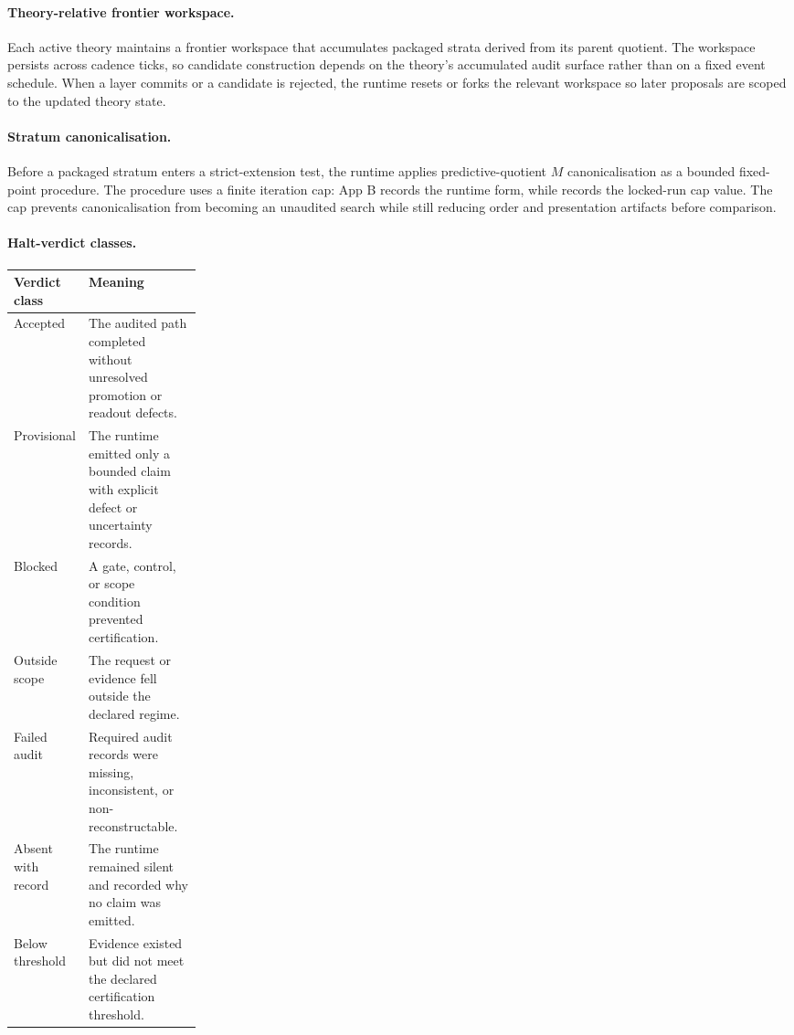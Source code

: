\documentclass{article}
\theoremstyle{definition}
\begin{document}
\paragraph{Theory-relative frontier workspace.}
Each active theory maintains a frontier workspace that accumulates packaged strata derived from its parent quotient. The workspace persists across cadence ticks, so candidate construction depends on the theory's accumulated audit surface rather than on a fixed event schedule. When a layer commits or a candidate is rejected, the runtime resets or forks the relevant workspace so later proposals are scoped to the updated theory state.

\paragraph{Stratum canonicalisation.}
Before a packaged stratum enters a strict-extension test, the runtime applies predictive-quotient \(M\) canonicalisation as a bounded fixed-point procedure. The procedure uses a finite iteration cap: App B records the runtime form, while  records the locked-run cap value. The cap prevents canonicalisation from becoming an unaudited search while still reducing order and presentation artifacts before comparison.

\paragraph{Halt-verdict classes.}
\begin{center}
\footnotesize
\begin{tabularx}{\linewidth}{@{}>{\raggedright\arraybackslash}p{0.24\linewidth}>{\raggedright\arraybackslash}X@{}}
\toprule
Verdict class & Meaning \\
\midrule
Accepted & The audited path completed without unresolved promotion or readout defects. \\
Provisional & The runtime emitted only a bounded claim with explicit defect or uncertainty records. \\
Blocked & A gate, control, or scope condition prevented certification. \\
Outside scope & The request or evidence fell outside the declared regime. \\
Failed audit & Required audit records were missing, inconsistent, or non-reconstructable. \\
Absent with record & The runtime remained silent and recorded why no claim was emitted. \\
Below threshold & Evidence existed but did not meet the declared certification threshold. \\
\bottomrule
\end{tabularx}
\end{center}
\end{document}
